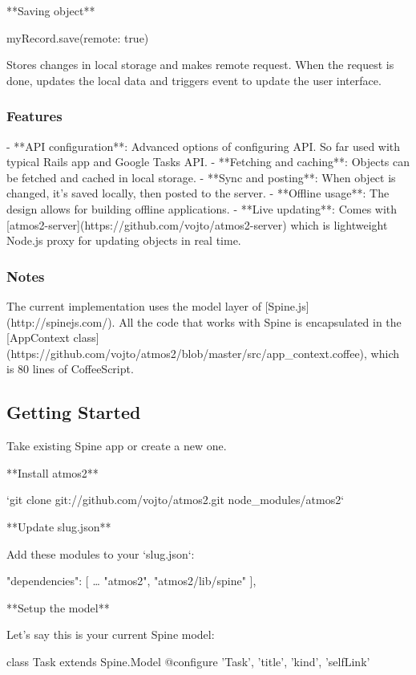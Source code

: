**Saving object**

    myRecord.save(remote: true)
    
Stores changes in local storage and makes remote request. When the request is done, updates the local data and triggers event to update the user interface.

\subsubsection{Features}

- **API configuration**: Advanced options of configuring API. So far used with typical Rails app and Google Tasks API.
- **Fetching and caching**: Objects can be fetched and cached in local storage.
- **Sync and posting**: When object is changed, it's saved locally, then posted to the server.
- **Offline usage**: The design allows for building offline applications.
- **Live updating**: Comes with [atmos2-server](https://github.com/vojto/atmos2-server) which is lightweight Node.js proxy for updating objects in real time. 

\subsubsection{Notes}

The current implementation uses the model layer of [Spine.js](http://spinejs.com/). All the code that works with Spine is encapsulated in the [AppContext class](https://github.com/vojto/atmos2/blob/master/src/app_context.coffee), which is 80 lines of CoffeeScript.

\subsection{Getting Started}

Take existing Spine app or create a new one.

**Install atmos2**

`git clone git://github.com/vojto/atmos2.git node_modules/atmos2`

**Update slug.json**

Add these modules to your `slug.json`:

    "dependencies": [
		…
    	"atmos2",
    	"atmos2/lib/spine"
  	],

**Setup the model**

Let's say this is your current Spine model:

    class Task extends Spine.Model
      @configure 'Task', 'title', 'kind', 'selfLink'

